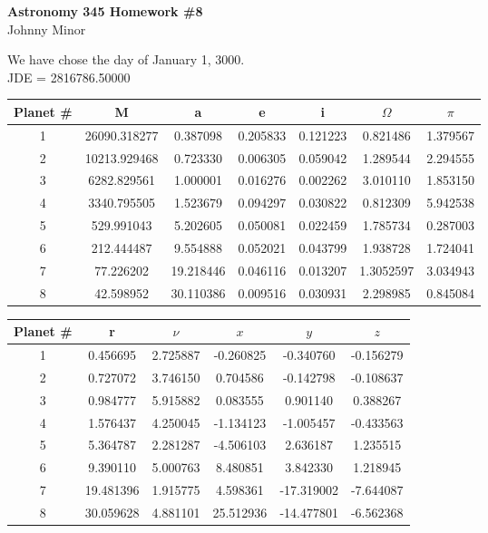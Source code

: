 \documentclass[12pt, leqno]{article}
\begin{document}
\centering 

\textbf{Astronomy 345 Homework \#8} \\
Johnny Minor 

\medskip 

We have chose the day of January 1, 3000. \\
JDE = 2816786.50000

\bigskip 

\begin{tabular}{|c|c|c|c|c|c|c|}
\hline
\textbf{Planet \#} & \bf M & \bf a & \bf e & \bf i & \boldmath$\Omega$ & \boldmath$\pi$ \\ \hline
1 & 26090.318277 & 0.387098 & 0.205833 & 0.121223 & 0.821486 & 1.379567 \\ \hline
2 & 10213.929468 & 0.723330 & 0.006305 & 0.059042 & 1.289544 & 2.294555 \\ \hline
3 & 6282.829561 & 1.000001 & 0.016276 & 0.002262 & 3.010110 & 1.853150 \\ \hline
4 & 3340.795505 & 1.523679 & 0.094297 & 0.030822 & 0.812309 & 5.942538 \\ \hline
5 & 529.991043 & 5.202605 & 0.050081 & 0.022459 & 1.785734 & 0.287003 \\ \hline 
6 & 212.444487 & 9.554888 & 0.052021 & 0.043799 & 1.938728 & 1.724041 \\ \hline
7 & 77.226202 & 19.218446 & 0.046116 & 0.013207 & 1.3052597 & 3.034943 \\ \hline
8 & 42.598952 & 30.110386 & 0.009516 & 0.030931 & 2.298985 & 0.845084 \\ \hline
\end{tabular}
\bigskip

\begin{tabular}{|c|c|c|c|c|c|}
\hline
\textbf{Planet \#} & \textbf{r} & \boldmath$\nu$ & \boldmath$x$ & \boldmath$y$ & \boldmath$z$ \\ \hline 
1 & 0.456695 & 2.725887 & -0.260825 & -0.340760 & -0.156279 \\ \hline
2 & 0.727072 & 3.746150 & 0.704586 & -0.142798 & -0.108637 \\ \hline
3 & 0.984777 & 5.915882 & 0.083555 & 0.901140 & 0.388267 \\ \hline
4 & 1.576437 & 4.250045 & -1.134123 & -1.005457 & -0.433563 \\ \hline
5 & 5.364787 & 2.281287 & -4.506103 & 2.636187 & 1.235515 \\ \hline
6 & 9.390110 & 5.000763 & 8.480851 & 3.842330 & 1.218945 \\ \hline
7 & 19.481396 & 1.915775 & 4.598361 & -17.319002 & -7.644087 \\ \hline
8 & 30.059628 & 4.881101 & 25.512936 & -14.477801 & -6.562368 \\ \hline
\end{tabular}
\end{document}
